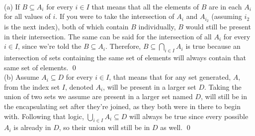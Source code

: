 \documentclass{article}
\begin{document}
\begin{enumerate}
\begin{enumerate}
    \end{enumerate} \\
    \newline
    (a) If $B \subseteq A_i$ for every $i \in I$ that means that all the elements of $B$ are in each $A_i$ for all values of $i$. If you were to take the intersection of $A_i$ and $A_i_2$ (assuming $i_2$ is the next index), both of which contain $B$ individually, $B$ would still be present in their intersection. The same can be said for the intersection of all $A_i$ for every $i \in I$, since we're told the $B \subseteq A_i$. Therefore, $B           \subseteq \bigcap_{i \in I} A_i$ is true because an intersection of sets containing the same set of elements will always contain that same set of elements. \qed \\
    \newline
    (b) Assume $A_i \subseteq D$ for every $i \in I$, that means that for any set generated, $A$, from the index set $I$, denoted $A_i$,  will be present in a larger set $D$. Taking the union of two sets we assume are present in a larger set named $D$, will still be in the encapsulating set after they're joined, as they both were in there to begin with. Following that logic, $\bigcup_{i \in I} A_i \subseteq D$ will always be true since every possible $A_i$ is already in $D$, so their union will still be in $D$ as well. \qed
 \end{enumerate}
\end{document}

